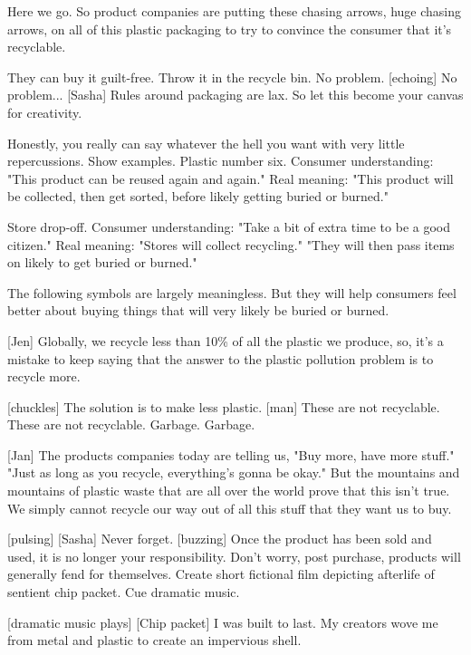 \documentclass[a4paper]{article}
\begin{document}
	
	Here we go.
	So product companies are putting these chasing arrows, huge chasing arrows, on all of this plastic packaging to try to convince the consumer that it's recyclable.
	
	
	They can buy it guilt-free.
	Throw it in the recycle bin.
	No problem.
	[echoing] No problem...
	[Sasha] Rules around packaging are lax.
	So let this become your canvas for creativity.
	
	
	Honestly, you really can say whatever the hell you want with very little repercussions.
	Show examples.
	Plastic number six.
	Consumer understanding:
	"This product can be reused again and again." Real meaning: "This product will be collected, then get sorted, before likely getting buried or burned."
	
	
	Store drop-off.
	Consumer understanding: "Take a bit of extra time to be a good citizen."
	Real meaning: "Stores will collect recycling."
	"They will then pass items on likely to get buried or burned."
	
	
	
	The following symbols are largely meaningless.
	But they will help consumers feel better about buying things that will very likely be buried or burned.
	
	
	[Jen] Globally, we recycle less than 10\% of all the plastic we produce, so, it's a mistake to keep saying that the answer to the plastic pollution problem is to recycle more.
	
	
	[chuckles] The solution is to make less plastic.
	[man] These are not recyclable.
	These are not recyclable. Garbage. Garbage.
	
	
	[Jan] The products companies today are telling us,
	"Buy more, have more stuff."
	"Just as long as you recycle, everything's gonna be okay."
	But the mountains and mountains of plastic waste that are all over the world prove that this isn't true.
	We simply cannot recycle our way out of all this stuff that they want us to buy.
	
	
	
	
	[pulsing]
	[Sasha] Never forget.
	[buzzing]
	Once the product has been sold and used, it is no longer your responsibility.
	Don't worry, post purchase, products will generally fend for themselves.
	Create short fictional film depicting afterlife of sentient chip packet.
	Cue dramatic music.
	
	
	[dramatic music plays]
	[Chip packet] I was built to last.
	My creators wove me from metal and plastic to create an impervious shell.
	
\end{document}
